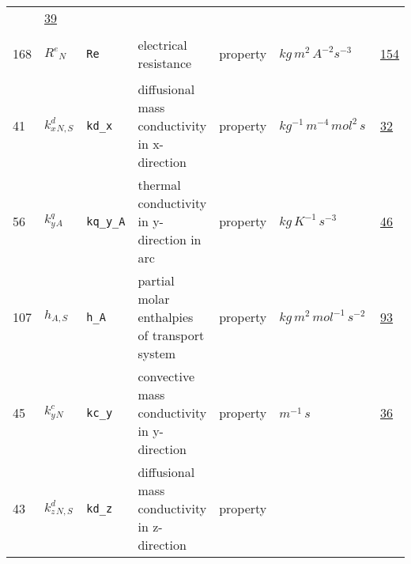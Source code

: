 \begin{longtable}{|p{1cm}|p{2.5cm}|p{4.5cm}|p{8cm}|p{3.0cm}|p{3cm}|p{1cm}|}
             &                 \hyperlink{"e:39"}{ 39 }
                 \\
            168
             & \hypertarget{"v:168"}{ $ {{R^e}}{_{N}} $}
             & \verb|Re|
             & electrical resistance
             & \begin{lay}property \end{lay}
             & $ kg \,m^{2} \,A^{-2} s^{-3} \, $
             &                 \hyperlink{"e:154"}{ 154 }
                 \\
            41
             & \hypertarget{"v:41"}{ $ {{k^d_x}}{_{N, S}} $}
             & \verb|kd_x|
             & diffusional mass conductivity in x-direction
             & \begin{lay}property \end{lay}
             & $ kg^{-1} \,m^{-4} \,mol^{2} \,s \, $
             &                 \hyperlink{"e:32"}{ 32 }
                 \\
            56
             & \hypertarget{"v:56"}{ $ {{k^q_y}}{_{A}} $}
             & \verb|kq_y_A|
             & thermal conductivity in y-direction in arc
             & \begin{lay}property \end{lay}
             & $ kg \,K^{-1} \,s^{-3} \, $
             &                 \hyperlink{"e:46"}{ 46 }
                 \\
            107
             & \hypertarget{"v:107"}{ $ {h}{_{A, S}} $}
             & \verb|h_A|
             & partial molar enthalpies of transport system
             & \begin{lay}property \end{lay}
             & $ kg \,m^{2} \,mol^{-1} \,s^{-2} \, $
             &                 \hyperlink{"e:93"}{ 93 }
                 \\
            45
             & \hypertarget{"v:45"}{ $ {{k^c_y}}{_{N}} $}
             & \verb|kc_y|
             &  convective mass conductivity in y-direction
             & \begin{lay}property \end{lay}
             & $ m^{-1} \,s \, $
             &                 \hyperlink{"e:36"}{ 36 }
                 \\
            43
             & \hypertarget{"v:43"}{ $ {{k^d_z}}{_{N, S}} $}
             & \verb|kd_z|
             & diffusional mass conductivity in z-direction
             & \begin{lay}property \end{lay}

\end{longtable}
